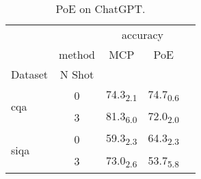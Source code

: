 \begin{table}[h]
\centering
\caption{PoE on ChatGPT.}
\label{tab:llm}
\begin{tabular}{lcccc}
 &  & \multicolumn{2}{c}{accuracy} \\
 & method & MCP & PoE \\
Dataset & N Shot &  &  \\
\multirow[c]{2}{*}{cqa} & 0 & 74.3\textsubscript{2.1} & 74.7\textsubscript{0.6} \\
 & 3 & 81.3\textsubscript{6.0} & 72.0\textsubscript{2.0} \\
\multirow[c]{2}{*}{siqa} & 0 & 59.3\textsubscript{2.3} & 64.3\textsubscript{2.3} \\
 & 3 & 73.0\textsubscript{2.6} & 53.7\textsubscript{5.8} \\
\end{tabular}
\end{table}
